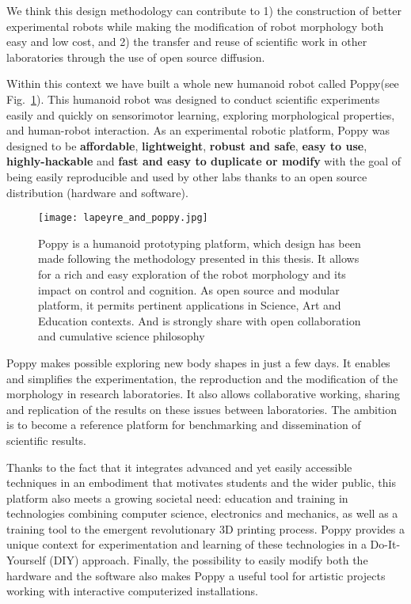We think this design methodology can contribute to  1) the construction of better experimental robots while making the modification of robot morphology both easy and low cost, and 2) the transfer and reuse of scientific work in other laboratories through the use of open source diffusion.

Within this context we have built a whole new humanoid robot called Poppy\texttrademark (see Fig.~\ref{fig:poppy_with_me}). This humanoid robot was designed to conduct scientific experiments easily and quickly on sensorimotor learning, exploring morphological properties, and human-robot interaction. As an experimental robotic platform, Poppy was designed to be \textbf{affordable}, \textbf{lightweight}, \textbf{robust and safe}, \textbf{easy to use}, \textbf{highly-hackable} and \textbf{fast and easy to duplicate or modify} with the goal of being easily reproducible and used by other labs thanks to an open source distribution (hardware and software).

\begin{figure}[tb]
    \begin{center}
        \texttt{[image: lapeyre\_and\_poppy.jpg]}
    \end{center}
    \caption{Poppy is a humanoid prototyping platform, which design has been made following the methodology presented in this thesis. It allows for a rich and easy exploration of the robot morphology and its impact on control and cognition. As open source and modular platform, it permits pertinent applications in Science, Art and Education contexts. And is strongly share with open collaboration and cumulative science philosophy}
    \label{fig:poppy_with_me}
\end{figure}

Poppy makes possible exploring new body shapes in just a few days. It enables and simplifies the experimentation, the reproduction and the modification of the morphology in research laboratories. It also allows collaborative working, sharing and replication of the results on these issues between laboratories. The ambition is to become a reference platform for benchmarking and dissemination of scientific results.

Thanks to the fact that it integrates advanced and yet easily accessible techniques in an embodiment that motivates students and the wider public, this platform also meets a growing societal need: education and training in technologies combining computer science, electronics and mechanics, as well as a training tool to the emergent revolutionary 3D printing process. Poppy provides a unique context for experimentation and learning of these technologies in a Do-It-Yourself (DIY) approach. Finally, the possibility to easily modify both the hardware and the software also makes Poppy a useful tool for artistic projects working with interactive computerized installations.


